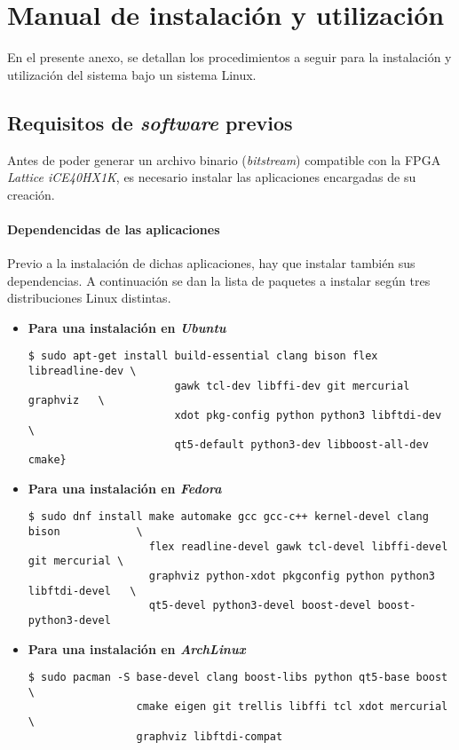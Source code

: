 \chapter{Manual de instalación y utilización}
\label{ch:manual}

En el presente anexo, se detallan los procedimientos a seguir para la instalación y utilización del sistema bajo un sistema Linux.

\section{Requisitos de \emph{software} previos}
Antes de poder generar un archivo binario (\emph{bitstream}) compatible con la FPGA \emph{Lattice iCE40HX1K}, es necesario instalar las aplicaciones encargadas de su creación.

\subsubsection{Dependencidas de las aplicaciones}
Previo a la instalación de dichas aplicaciones, hay que instalar también sus dependencias. A continuación se dan la lista de paquetes a instalar según tres distribuciones Linux distintas.

\begin{itemize}
    \item \textbf{Para una instalación en \emph{Ubuntu}} \\
    \begin{verbatim}
$ sudo apt-get install build-essential clang bison flex libreadline-dev \
                       gawk tcl-dev libffi-dev git mercurial graphviz   \
                       xdot pkg-config python python3 libftdi-dev       \
                       qt5-default python3-dev libboost-all-dev cmake}
    \end{verbatim}

    \item \textbf{Para una instalación en \emph{Fedora}} \\
    \begin{verbatim}
$ sudo dnf install make automake gcc gcc-c++ kernel-devel clang bison            \
                   flex readline-devel gawk tcl-devel libffi-devel git mercurial \
                   graphviz python-xdot pkgconfig python python3 libftdi-devel   \
                   qt5-devel python3-devel boost-devel boost-python3-devel
    \end{verbatim}

    \item \textbf{Para una instalación en \emph{ArchLinux}} \\
    \begin{verbatim}
$ sudo pacman -S base-devel clang boost-libs python qt5-base boost \
                 cmake eigen git trellis libffi tcl xdot mercurial \
                 graphviz libftdi-compat 
    \end{verbatim}
\end{itemize}

